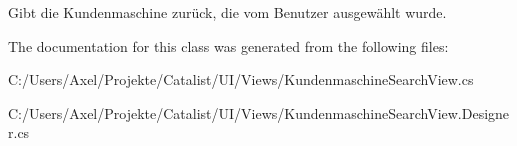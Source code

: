 Gibt die Kundenmaschine zurück, die vom Benutzer ausgewählt wurde. 



The documentation for this class was generated from the following files\+:\begin{DoxyCompactItemize}
\item 
C\+:/\+Users/\+Axel/\+Projekte/\+Catalist/\+U\+I/\+Views/Kundenmaschine\+Search\+View.\+cs\item 
C\+:/\+Users/\+Axel/\+Projekte/\+Catalist/\+U\+I/\+Views/Kundenmaschine\+Search\+View.\+Designer.\+cs\end{DoxyCompactItemize}

